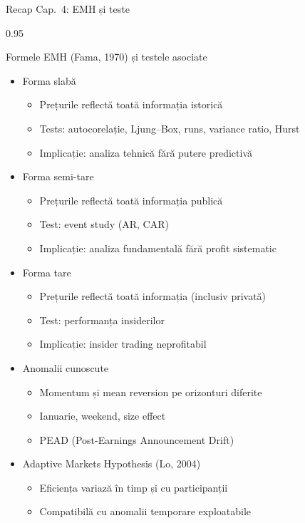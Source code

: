\documentclass[9pt, aspectratio=169, t]{beamer}
\begin{document}
\begin{frame}[shrink=25]{Recap Cap.~4: EMH și teste}
\begin{cminipage}{0.95\textwidth}
\begin{block}{Formele EMH (Fama, 1970) și testele asociate}
\begin{itemize}\setlength{\itemsep}{0pt}
    \item Forma slabă
    \begin{itemize}\setlength{\itemsep}{0pt}
        \item Prețurile reflectă toată informația istorică
        \item Tests: autocorelație, Ljung--Box, runs, variance ratio, Hurst
        \item Implicație: analiza tehnică fără putere predictivă
    \end{itemize}
    \item Forma semi-tare
    \begin{itemize}\setlength{\itemsep}{0pt}
        \item Prețurile reflectă toată informația publică
        \item Test: event study (AR, CAR)
        \item Implicație: analiza fundamentală fără profit sistematic
    \end{itemize}
    \item Forma tare
    \begin{itemize}\setlength{\itemsep}{0pt}
        \item Prețurile reflectă toată informația (inclusiv privată)
        \item Test: performanța insiderilor
        \item Implicație: insider trading neprofitabil
    \end{itemize}
    \item Anomalii cunoscute
    \begin{itemize}\setlength{\itemsep}{0pt}
        \item Momentum și mean reversion pe orizonturi diferite
        \item Ianuarie, weekend, size effect
        \item PEAD (Post-Earnings Announcement Drift)
    \end{itemize}
    \item Adaptive Markets Hypothesis (Lo, 2004)
    \begin{itemize}\setlength{\itemsep}{0pt}
        \item Eficiența variază în timp și cu participanții
        \item Compatibilă cu anomalii temporare exploatabile
    \end{itemize}
\end{itemize}
\end{block}
\end{cminipage}
\end{frame}
\end{document}
